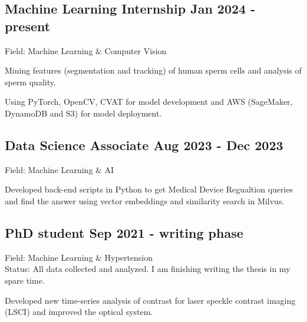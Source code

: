 \documentclass[a4paper,12pt]{article}
\begin{document}


\subsection{Machine Learning Internship \hfill Jan 2024 - present}
\vspace*{1pt}
Field: Machine Learning \& Computer Vision \\
\vspace*{\spaceAfterField}
\begin{zitemize}
\item Mining features (segmentation and tracking) of human sperm cells and analysis of sperm quality.
\item Using PyTorch, OpenCV, CVAT for model development and AWS (SageMaker, DynamoDB and S3) for model deployment.
\end{zitemize}
\vspace*{5pt}


\subsection{Data Science Associate \hfill Aug 2023 - Dec 2023}
\vspace*{1pt}
Field: Machine Learning \& AI \\
\vspace*{\spaceAfterField}
\begin{zitemize}
\item Developed back-end scripts in Python to get Medical Device Regualtion queries and find the answer using vector embeddings and similarity search in Milvus.
\end{zitemize}
\vspace*{5pt}


\subsection{PhD student \hfill Sep 2021 - writing phase}
\vspace*{1pt}
Field: Machine Learning \& Hypertension \\
Status: All data collected and analyzed. I am finishing writing the thesis in my spare time.
\vspace*{\spaceAfterField}
\begin{zitemize}
\item Developed new time-series analysis of contrast for laser speckle contrast imaging (LSCI) and improved the optical system.
\end{zitemize}
\vspace*{5pt}
\end{document}
